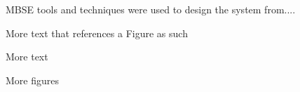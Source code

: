 
MBSE tools and techniques were used to design the system from....


More text that references a Figure as such %


More text

More figures

